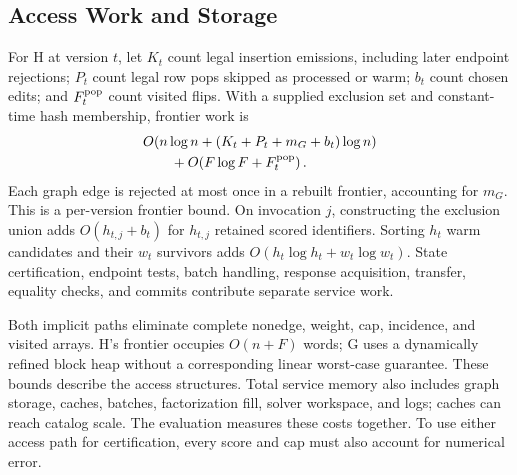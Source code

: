 \subsection{Access Work and Storage}
For H at version $t$, let $K_t$ count legal insertion emissions, including later endpoint rejections; $P_t$ count legal row pops skipped as processed or warm; $b_t$ count chosen edits; and $F_t^{\rm pop}$ count visited flips. With a supplied exclusion set and constant-time hash membership, frontier work is
\begin{equation}
 \begin{aligned}
 &O\!\left(n\log n+(K_t+P_t+m_G+b_t)\log n\right)\\
 &\qquad +O\!\left(F\log F+F_t^{\rm pop}\right).
 \end{aligned}
 \label{eq:frontier-cost}
\end{equation}
Each graph edge is rejected at most once in a rebuilt frontier, accounting for $m_G$. This is a per-version frontier bound. On invocation $j$, constructing the exclusion union adds $O(h_{t,j}+b_t)$ for $h_{t,j}$ retained scored identifiers. Sorting $h_t$ warm candidates and their $w_t$ survivors adds $O(h_t\log h_t+w_t\log w_t)$. State certification, endpoint tests, batch handling, response acquisition, transfer, equality checks, and commits contribute separate service work.

Both implicit paths eliminate complete nonedge, weight, cap, incidence, and visited arrays. H's frontier occupies $O(n+F)$ words; G uses a dynamically refined block heap without a corresponding linear worst-case guarantee. These bounds describe the access structures. Total service memory also includes graph storage, caches, batches, factorization fill, solver workspace, and logs; caches can reach catalog scale. The evaluation measures these costs together. To use either access path for certification, every score and cap must also account for numerical error.
